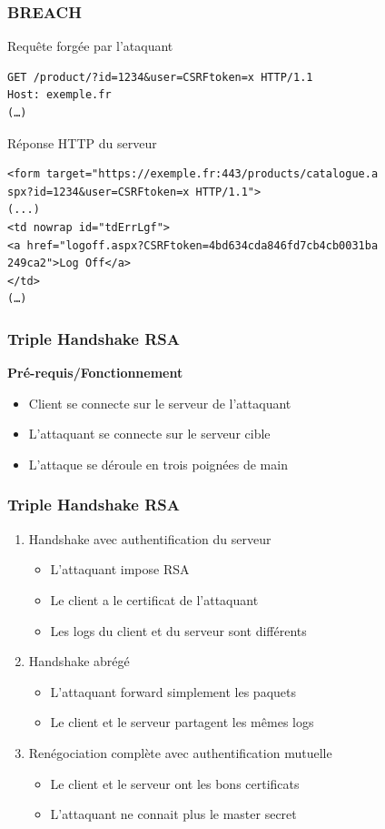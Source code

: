 \begin{frame}[fragile]
  \frametitle{BREACH}

\begin{block}{ Requête forgée par l'ataquant }
\begin{verbatim}
GET /product/?id=1234&user=CSRFtoken=x HTTP/1.1
Host: exemple.fr
(…)
\end{verbatim}
\end{block}

\begin{block}{Réponse HTTP du serveur}
\begin{verbatim}
<form target="https://exemple.fr:443/products/catalogue.a
spx?id=1234&user=CSRFtoken=x HTTP/1.1">
(...)
<td nowrap id="tdErrLgf">
<a href="logoff.aspx?CSRFtoken=4bd634cda846fd7cb4cb0031ba
249ca2">Log Off</a>
</td>
(…)
\end{verbatim}
\end{block}
\end{frame}

\begin{frame}
  \frametitle{Triple Handshake RSA}
  \textbf{Pré-requis/Fonctionnement}
  \begin{itemize}
  \item Client se connecte sur le serveur de l'attaquant
  \item L'attaquant se connecte sur le serveur cible
  \item L'attaque se déroule en trois poignées de main
\end{itemize}
\end{frame}

\begin{frame}
  \frametitle{Triple Handshake RSA}
    \begin{enumerate}
    \item Handshake avec authentification du serveur
      \begin{itemize}
      \item L'attaquant impose RSA
      \item Le client a le certificat de l'attaquant
      \item Les logs du client et du serveur sont différents
      \end{itemize}
      \pause
    \item Handshake abrégé
      \begin{itemize}
      \item L'attaquant forward simplement les paquets
      \item Le client et le serveur partagent les mêmes logs
      \end{itemize}
      \pause
    \item Renégociation complète avec authentification mutuelle
      \begin{itemize}
      \item Le client et le serveur ont les bons certificats
      \item L'attaquant ne connait plus le master secret
      \end{itemize}
    \end{enumerate}

\end{frame}

